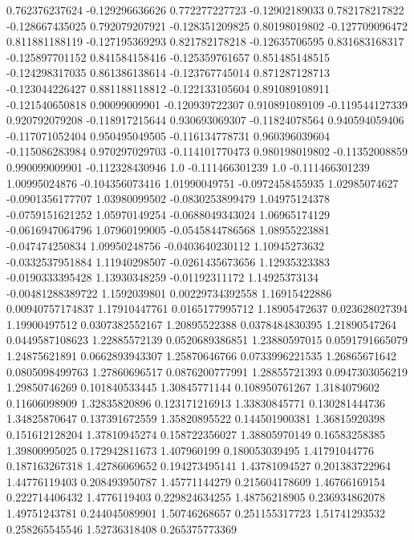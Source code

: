  0.762376237624  -0.129296636626
 0.772277227723   -0.12902189033
 0.782178217822  -0.128667435025
 0.792079207921  -0.128351209825
  0.80198019802  -0.127709096472
 0.811881188119  -0.127195369293
 0.821782178218   -0.12635706595
 0.831683168317  -0.125897701152
 0.841584158416  -0.125359761657
 0.851485148515  -0.124298317035
 0.861386138614  -0.123767745014
 0.871287128713  -0.123044226427
 0.881188118812  -0.122133105604
 0.891089108911  -0.121540650818
  0.90099009901  -0.120939722307
 0.910891089109  -0.119544127339
 0.920792079208  -0.118917215644
 0.930693069307   -0.11824078564
 0.940594059406  -0.117071052404
 0.950495049505  -0.116134778731
 0.960396039604  -0.115086283984
 0.970297029703  -0.114101770473
 0.980198019802   -0.11352008859
 0.990099009901  -0.112328430946
            1.0  -0.111466301239
            1.0  -0.111466301239
  1.00995024876  -0.104356073416
  1.01990049751  -0.0972458455935
  1.02985074627  -0.0901356177707
  1.03980099502  -0.0830253899479
  1.04975124378  -0.0759151621252
  1.05970149254  -0.0688049343024
  1.06965174129  -0.0616947064796
  1.07960199005  -0.0545844786568
  1.08955223881  -0.047474250834
  1.09950248756  -0.0403640230112
  1.10945273632  -0.0332537951884
  1.11940298507  -0.0261435673656
  1.12935323383  -0.0190333395428
  1.13930348259   -0.01192311172
  1.14925373134  -0.00481288389722
   1.1592039801  0.00229734392558
  1.16915422886  0.00940757174837
  1.17910447761  0.0165177995712
  1.18905472637   0.023628027394
  1.19900497512  0.0307382552167
  1.20895522388  0.0378484830395
  1.21890547264  0.0449587108623
  1.22885572139  0.0520689386851
  1.23880597015  0.0591791665079
  1.24875621891  0.0662893943307
  1.25870646766  0.0733996221535
  1.26865671642  0.0805098499763
  1.27860696517  0.0876200777991
  1.28855721393  0.0947303056219
  1.29850746269   0.101840533445
  1.30845771144   0.108950761267
   1.3184079602    0.11606098909
  1.32835820896   0.123171216913
  1.33830845771   0.130281444736
  1.34825870647   0.137391672559
  1.35820895522   0.144501900381
  1.36815920398   0.151612128204
  1.37810945274   0.158722356027
  1.38805970149    0.16583258385
  1.39800995025   0.172942811673
    1.407960199   0.180053039495
  1.41791044776   0.187163267318
  1.42786069652   0.194273495141
  1.43781094527   0.201383722964
  1.44776119403   0.208493950787
  1.45771144279   0.215604178609
  1.46766169154   0.222714406432
   1.4776119403   0.229824634255
  1.48756218905   0.236934862078
  1.49751243781   0.244045089901
  1.50746268657   0.251155317723
  1.51741293532   0.258265545546
  1.52736318408   0.265375773369
